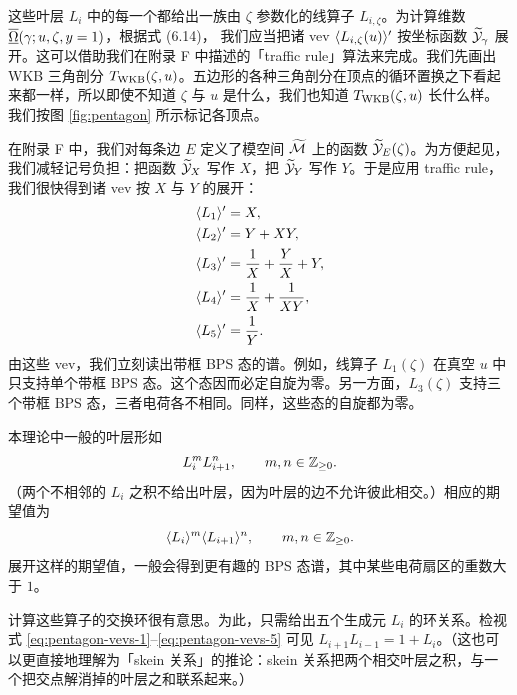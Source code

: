 这些叶层 $L_i$ 中的每一个都给出一族由 $\zeta$ 参数化的线算子 $L_{i,\zeta}$。为计算维数 $\overline{\underline{\Omega}}(\gamma; u, \zeta, y = 1)$，根据式 (6.14)，%
我们应当把诸 vev $\langle L_{i,\zeta}(u) \rangle'$ 按坐标函数 $\widetilde{\cal Y}_\gamma$ 展开。这可以借助我们在附录 F%
中描述的「traffic rule」算法来完成。我们先画出 WKB 三角剖分 $T_{\rm WKB}(\zeta, u)$。五边形的各种三角剖分在顶点的循环置换之下看起来都一样，所以即使不知道 $\zeta$ 与 $u$ 是什么，我们也知道 $T_{\rm WKB}(\zeta, u)$ 长什么样。我们按图 \ref{fig:pentagon} 所示标记各顶点。

在附录 F%
中，我们对每条边 $E$ 定义了模空间 $\widetilde{\cal M}$ 上的函数 $\widetilde{\cal Y}_E(\zeta)$。为方便起见，我们减轻记号负担：把函数 $\widetilde{\cal Y}_X$ 写作 $X$，把 $\widetilde{\cal Y}_Y$ 写作 $Y$。于是应用 traffic rule，我们很快得到诸 vev 按 $X$ 与 $Y$ 的展开：
\begin{align}
\langle L_1 \rangle' &= X, \label{eq:pentagon-vevs-1} \\
\langle L_2 \rangle' &= Y + XY, \\
\langle L_3 \rangle' &= \frac{1}{X} + \frac{Y}{X} + Y, \\
\langle L_4 \rangle' &= \frac{1}{X} + \frac{1}{XY}, \\
\langle L_5 \rangle' &= \frac{1}{Y}. \label{eq:pentagon-vevs-5}
\end{align}
由这些 vev，我们立刻读出带框 BPS 态的谱。例如，线算子 $L_1(\zeta)$ 在真空 $u$ 中只支持单个带框 BPS 态。这个态因而必定自旋为零。另一方面，$L_3(\zeta)$ 支持三个带框 BPS 态，三者电荷各不相同。同样，这些态的自旋都为零。

本理论中一般的叶层形如
\begin{equation}\label{eq:ADN3-gen-lam}
L_i^m L_{i+1}^n, \qquad m, n \in \mathbb{Z}_{\ge 0}.
\end{equation}
（两个不相邻的 $L_i$ 之积不给出叶层，因为叶层的边不允许彼此相交。）相应的期望值为
\begin{equation}
\langle L_i \rangle^m \langle L_{i+1} \rangle^n, \qquad m, n \in \mathbb{Z}_{\ge 0}.
\end{equation}
展开这样的期望值，一般会得到更有趣的 BPS 态谱，其中某些电荷扇区的重数大于 $1$。

计算这些算子的交换环很有意思。为此，只需给出五个生成元 $L_i$ 的环关系。检视式 \eqref{eq:pentagon-vevs-1}--\eqref{eq:pentagon-vevs-5} 可见 $L_{i+1} L_{i-1} = 1 + L_i$。（这也可以更直接地理解为「skein 关系」的推论：skein 关系把两个相交叶层之积，与一个把交点解消掉的叶层之和联系起来。）

